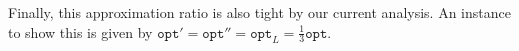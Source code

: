 \documentclass[10pt,a4paper]{amsart}
\newcommand{\prof}[1]{p\left(#1\right)}         %
\newcommand{\eps}{\varepsilon}
\newtheorem{lemma}[theorem]{Lemma}
\theoremstyle{definition}
\newcommand{\opt}{\mathtt{opt}}
\newcommand{\Optbare}{\mathtt{Opt}}
\begin{document}
Finally, this approximation ratio is also tight by our current analysis. An instance to show this is given by $\opt'=\opt''=\opt_L=\frac{1}{3}\opt.$

% 
\end{document}

